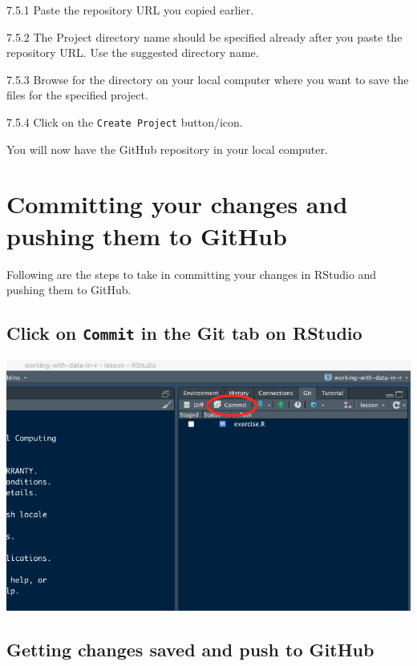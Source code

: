 \documentclass[
  12pt,
]{book}
\begin{document}
7.5.1 Paste the repository URL you copied earlier.

7.5.2 The Project directory name should be specified already after you paste the repository URL. Use the suggested directory name.

7.5.3 Browse for the directory on your local computer where you want to save the files for the specified project.

7.5.4 Click on the \texttt{Create\ Project} button/icon.

You will now have the GitHub repository in your local computer.

\hypertarget{commit-and-push}{%
\chapter{Committing your changes and pushing them to GitHub}\label{commit-and-push}}

Following are the steps to take in committing your changes in RStudio and pushing them to GitHub.

\hypertarget{click-on-commit-in-the-git-tab-on-rstudio}{%
\section{\texorpdfstring{Click on \texttt{Commit} in the Git tab on RStudio}{Click on Commit in the Git tab on RStudio}}\label{click-on-commit-in-the-git-tab-on-rstudio}}

\includegraphics{images/commit_push_pull1.png}

\hypertarget{getting-changes-saved-and-push-to-github}{%
\section{Getting changes saved and push to GitHub}\label{getting-changes-saved-and-push-to-github}}
\end{document}
